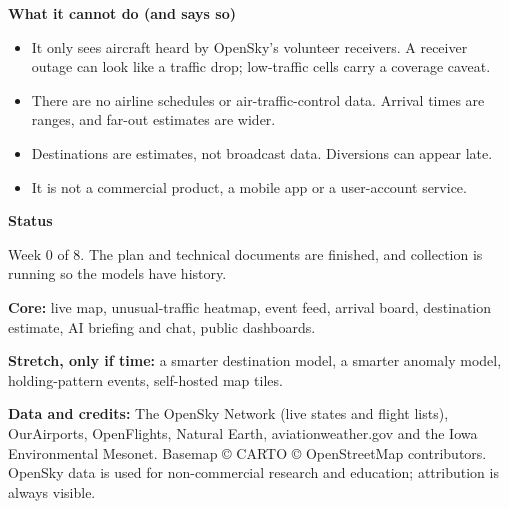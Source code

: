 \documentclass[10.5pt]{article}
\begin{document}
\vspace{4pt}
\begin{minipage}[t]{0.55\linewidth}
\begin{warncard}
{\bfseries What it cannot do (and says so)}
\begin{itemize}[leftmargin=1.0em,itemsep=1.5pt,topsep=2pt]
  \item It only sees aircraft heard by OpenSky's volunteer receivers. A receiver outage can look like a traffic drop; low-traffic cells carry a coverage caveat.
  \item There are no airline schedules or air-traffic-control data. Arrival times are ranges, and far-out estimates are wider.
  \item Destinations are estimates, not broadcast data. Diversions can appear late.
  \item It is not a commercial product, a mobile app or a user-account service.
\end{itemize}
\end{warncard}
\end{minipage}\hfill
\begin{minipage}[t]{0.42\linewidth}
\begin{accentcard}
{\bfseries Status}

\vspace{2pt}
{\small Week 0 of 8. The plan and technical documents are finished, and collection is running so the models have history.}

\vspace{2pt}
{\small \textbf{Core:} live map, unusual-traffic heatmap, event feed, arrival board, destination estimate, AI briefing and chat, public dashboards.}

\vspace{2pt}
{\small \textbf{Stretch, only if time:} a smarter destination model, a smarter anomaly model, holding-pattern events, self-hosted map tiles.}
\end{accentcard}
\end{minipage}

\vspace{4pt}
{\footnotesize\color{papermuted}
\textbf{Data and credits:} The OpenSky Network (live states and flight lists), OurAirports, OpenFlights, Natural Earth, aviationweather.gov and the Iowa Environmental Mesonet. Basemap © CARTO © OpenStreetMap contributors. OpenSky data is used for non-commercial research and education; attribution is always visible.
}
\end{document}
